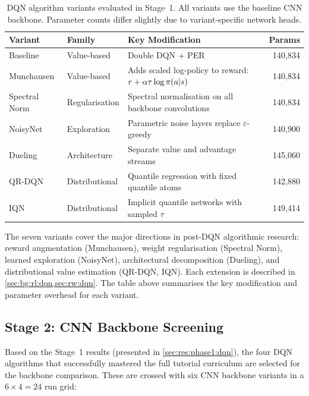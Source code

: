 \begin{table}[H]
  \centering
  \caption{DQN algorithm variants evaluated in Stage~1. All variants use the baseline CNN backbone. Parameter counts differ slightly due to variant-specific network heads.}
  \label{tab:exp:dqn_variants}
  \begin{tabularx}{\textwidth}{@{} l l X r @{}}
    \toprule
    \textbf{Variant} & \textbf{Family} & \textbf{Key Modification} & \textbf{Params} \\
    \midrule
    Baseline       & Value-based & Double DQN + PER \cite{hasselt2016ddqn,schaul2016per} & 140{,}834 \\
    Munchausen     & Value-based & Adds scaled log-policy to reward: $r + \alpha \tau \log \pi(a|s)$ \cite{vieillard2020munchausen} & 140{,}834 \\
    Spectral Norm  & Regularisation & Spectral normalisation \cite{miyato2018spectral} on all backbone convolutions & 140{,}834 \\
    NoisyNet       & Exploration  & Parametric noise layers replace $\varepsilon$-greedy \cite{fortunato2018noisy} & 140{,}900 \\
    Dueling        & Architecture & Separate value and advantage streams \cite{wang2016dueling} & 145{,}060 \\
    QR-DQN         & Distributional & Quantile regression with fixed quantile atoms \cite{dabney2018distributional} & 142{,}880 \\
    IQN            & Distributional & Implicit quantile networks with sampled $\tau$ \cite{dabney2018implicit} & 149{,}414 \\
    \bottomrule
  \end{tabularx}
\end{table}

The seven variants cover the major directions in post-DQN algorithmic research: reward augmentation (Munchausen), weight regularisation (Spectral Norm), learned exploration (NoisyNet), architectural decomposition (Dueling), and distributional value estimation (QR-DQN, IQN). Each extension is described in \cref{sec:bg:rl:dqn,sec:rw:dqn}. The table above summarises the key modification and parameter overhead for each variant.

\subsection{Stage 2: CNN Backbone Screening}
\label{sec:exp:architectures:cnn}

Based on the Stage~1 results (presented in \cref{sec:res:phase1:dqn}), the four DQN algorithms that successfully mastered the full tutorial curriculum are selected for the backbone comparison. These are crossed with six CNN backbone variants in a $6 \times 4 = 24$ run grid:

